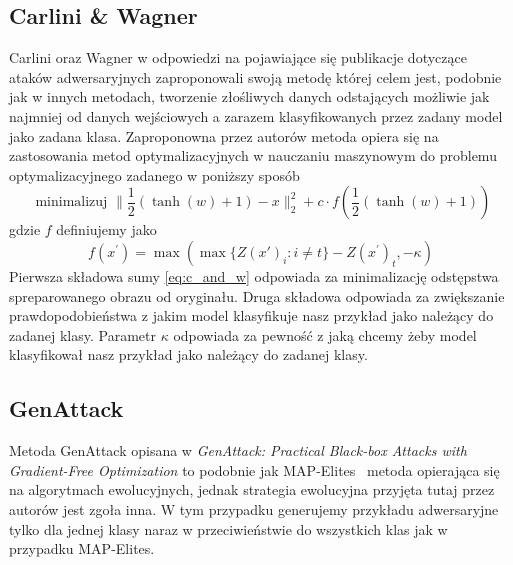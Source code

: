 \documentclass[
    left=2.5cm,         %
    right=2.5cm,        %
    top=2.5cm,          %
    bottom=3cm,         %
    bindingoffset=6mm,  %
    nohyphenation=false %
]{eiti/eiti-thesis}
\begin{document}
\subsection{Carlini \& Wagner}
Carlini oraz Wagner\cite{DBLP:journals/corr/CarliniW16a} w odpowiedzi na pojawiające się publikacje dotyczące
ataków adwersaryjnych zaproponowali swoją metodę której celem jest, podobnie jak w innych metodach,
tworzenie złośliwych danych
odstających możliwie jak najmniej od danych wejściowych a zarazem klasyfikowanych przez zadany model jako
zadana klasa. Zaproponowna przez autorów metoda opiera się na zastosowania metod optymalizacyjnych  w nauczaniu
maszynowym do problemu optymalizacyjnego zadanego w poniższy sposób
\begin{equation}\label{eq:c_and_w}
    \text { minimalizuj } \| \frac { 1 } { 2 } ( \tanh ( w ) + 1 ) - x \| _ { 2 } ^ { 2 } + c \cdot f ( \frac { 1 } { 2 } ( \tanh ( w ) + 1 ) )
\end{equation}
gdzie $f$ definiujemy jako
\begin{equation}
    f ( x ^ { \prime } ) = \max ( \max \{ Z ( x' ) _ { i } : i \neq t \} - Z ( x ^ { \prime } ) _ { t } , - \kappa)
\end{equation}
Pierwsza składowa sumy \eqref{eq:c_and_w} odpowiada za minimalizację odstępstwa spreparowanego obrazu
od oryginału. Druga składowa odpowiada za zwiększanie prawdopodobieństwa z jakim model klasyfikuje nasz przykład
jako należący do zadanej klasy. Parametr \(\kappa\) odpowiada za pewność z jaką chcemy żeby model klasyfikował nasz
przykład jako należący do zadanej klasy.



\subsection{GenAttack}
Metoda GenAttack opisana w
\textit{GenAttack: Practical Black-box Attacks with Gradient-Free Optimization}\cite{DBLP:journals/corr/abs-1805-11090}
to podobnie jak MAP-Elites~\cite{DBLP:journals/corr/NguyenYC14} metoda opierająca się na algorytmach ewolucyjnych, jednak strategia ewolucyjna
przyjęta tutaj przez autorów jest zgoła inna. W tym przypadku generujemy przykładu adwersaryjne tylko dla jednej klasy naraz
w przeciwieństwie do wszystkich klas jak w przypadku MAP-Elites.
\end{document}
